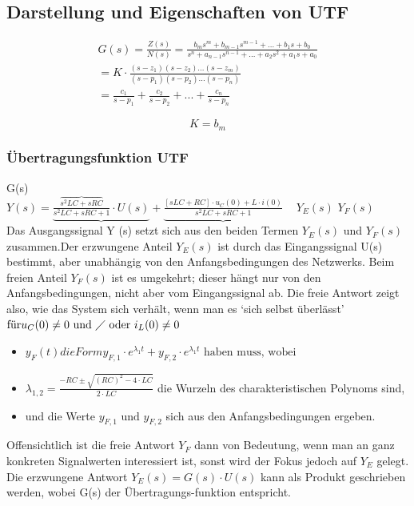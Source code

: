 \subsection{Darstellung und Eigenschaften von UTF}

\begin{eqnarray}
G(s)=\frac{Z(s)}{N(s)}=\frac{b_{m}s^m + b_{m-1}s^{m-1}+ ... + b_{1}s+b_{0}}{s^{n}+a_{n-1}s^{n-1} + ... + a_{2}s^{2}+a_{1}s + a_{0}} \\ = K\cdot \frac{(s-z_{1})(s-z_{2})...(s-z_{m})}{(s-p_{1})(s-p_{2})...(s-p_{n})} \\ = \frac{c_{1}}{s-p_{1}} + \frac{c_{2}}{s-p_{2}} + ...  + \frac{c_{n}}{s-p_{n}}
\end{eqnarray}

\begin{equation}
K=b_{m}
\end{equation}
\subsubsection{Übertragungsfunktion UTF}
\hspace{2.3cm}G(s)\\
$Y(s) = \underbrace{\frac{\overbrace{s^2 LC+sRC}}{s^2 LC +sRC +1}\cdot U(s)} + \underbrace{\frac{[sLC + RC] \cdot u_{C}(0) + L \cdot i(0)}{s^2 LC +sRC +1}}$ \newline
\textcolor{white}{x} \hspace{2.4cm} $Y_{E}(s)$ \hspace{3.8cm} $Y_{F}(s)$ \\
Das Ausgangssignal Y (s) setzt sich aus den beiden Termen $Y_{E}(s)$ und $Y_{F}(s)$ zusammen.Der erzwungene Anteil $Y_{E}(s)$ ist durch das Eingangssignal U(s) bestimmt, aber unabhängig von den Anfangsbedingungen des Netzwerks.
Beim freien Anteil $Y_{F}(s)$ ist es umgekehrt; dieser hängt nur von den Anfangsbedingungen,
nicht aber vom Eingangssignal ab. Die freie Antwort zeigt also, wie
das System sich verhält, wenn man es ‘sich selbst überlässt’
$\text{für} u_{C}(0) \neq 0 \text{ und } \diagup \text{ oder } i_{L}(0) \neq 0$
\begin{itemize}
	\item $ y_{F}(t) die Form y_{F,1} \cdot e^{\lambda_{1}t} + y_{F,2} \cdot e^{\lambda_{1}t} \text{ haben muss, wobei}$
	\item $ \lambda_{1,2}= \frac{-RC \pm \sqrt{(RC)^2 - 4 \cdot LC} }{2 \cdot LC}$ die Wurzeln des charakteristischen Polynoms sind,
	\item und die Werte $y_{F,1} \text{ und } y_{F,2}$ sich aus den Anfangsbedingungen ergeben.
\end{itemize}
Offensichtlich ist die freie Antwort $Y_{F}$ dann von Bedeutung, wenn man an ganz konkreten
Signalwerten interessiert ist, sonst wird der Fokus jedoch auf $Y_{E}$ gelegt. \\
Die erzwungene Antwort $Y_{E}(s) = G(s) \cdot U(s)$ kann als Produkt geschrieben werden, wobei G(s) der Übertragungs-funktion entspricht.

